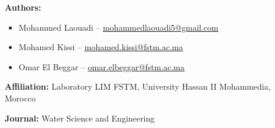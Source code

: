 \documentclass[a4paper,12pt]{article}
\begin{document}
\noindent
\textbf{Authors:}
\begin{itemize}
    \item Mohammed Laouadi -- \href{mailto:mohammedlaouadi5@gmail.com}{mohammedlaouadi5@gmail.com}
    \item Mohamed Kissi -- \href{mailto:mohamed.kissi@fstm.ac.ma}{mohamed.kissi@fstm.ac.ma}
    \item Omar El Beggar -- \href{mailto:omar.elbeggar@fstm.ac.ma}{omar.elbeggar@fstm.ac.ma}
\end{itemize}

\vspace{0.5cm}

\noindent
\textbf{Affiliation:} Laboratory LIM FSTM, University Hassan II Mohammedia, Morocco

\vspace{0.5cm}

\noindent
\textbf{Journal:} Water Science and Engineering
\end{document}
